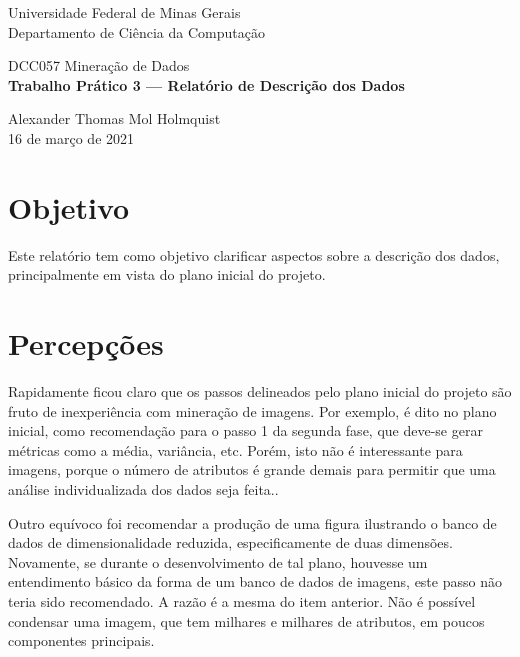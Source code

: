 \documentclass[12pt,oneside,a4paper]{article}
\begin{document}
\begin{titlepage}
\enlargethispage{\footskip}
\setlength{\parindent}{0pt}

\begin{center}
    \onehalfspacing
    \Large Universidade Federal de Minas Gerais
    \\ Departamento de Ciência da Computação
    
    \vspace{80mm}
    
    \Large{DCC057 Mineração de Dados}
    \\ \Large \textbf{Trabalho Prático 3 --- Relatório de Descrição dos Dados}
    
\end{center}

\vspace{\fill}

\begin{minipage}[b]{\textwidth}
    \centering
    \onehalfspacing
    \large
    Alexander Thomas Mol Holmquist \\
    16 de março de 2021

\end{minipage}

\end{titlepage}

\justify

\section{Objetivo}

Este relatório tem como objetivo clarificar aspectos sobre a descrição dos dados, principalmente em vista do plano inicial do projeto.

\section{Percepções}

Rapidamente ficou claro que os passos delineados pelo plano inicial do projeto são fruto de inexperiência com mineração de imagens. Por exemplo, é dito no plano inicial, como recomendação para o passo 1 da segunda fase, que deve-se gerar métricas como a média, variância, etc. Porém, isto não é interessante para imagens, porque o número de atributos é grande demais para permitir que uma análise individualizada dos dados seja feita..

Outro equívoco foi recomendar a produção de uma figura ilustrando o banco de dados de dimensionalidade reduzida, especificamente de duas dimensões. Novamente, se durante o desenvolvimento de tal plano, houvesse um entendimento básico da forma de um banco de dados de imagens, este passo não teria sido recomendado. A razão é a mesma do item anterior. Não é possível condensar uma imagem, que tem milhares e milhares de atributos, em poucos componentes principais.
\end{document}
